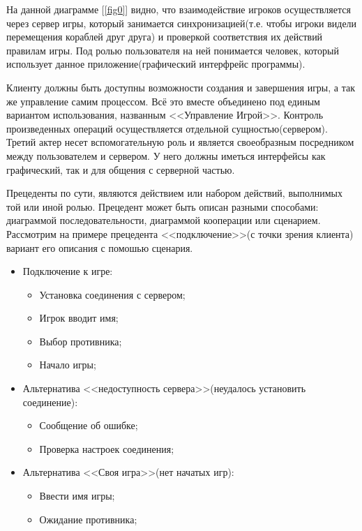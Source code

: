На данной диаграмме [\ref{fig0}] видно, что взаимодействие игроков осуществляется через сервер игры, который
занимается синхронизацией(т.е. чтобы игроки видели перемещения кораблей друг друга)
и проверкой соответствия их действий правилам игры. Под ролью пользователя на ней понимается 
человек, который использует данное приложение(графический интерфрейс программы).

Клиенту должны быть доступны возможности создания и завершения игры, а так же управление самим процессом. Всё это вместе объединено под единым вариантом использования, названным <<Управление Игрой>>. Контроль произведенных операций осуществляется отдельной сущностью(сервером). Третий актер несет вспомогательную роль и является своеобразным посредником между пользователем и сервером. У него должны иметься интерфейсы как графический, так и для общения с серверной частью. 

Прецеденты по сути, являются действием или набором действий, выполнимых той или иной ролью. Прецедент может быть описан разными способами: диаграммой последовательности, диаграммой кооперации или сценарием.
Рассмотрим на примере прецедента <<подключение>>(с точки зрения клиента) вариант его описания с помошью сценария.

\begin{itemize}
	\item Подключение к игре:
	\begin{itemize}
		\item Установка соединения с сервером;
		\item Игрок вводит имя;
		\item Выбор противника;
		\item Начало игры;
  	\end{itemize} 
	\item Альтернатива <<недоступность сервера>>(неудалось установить соединение): 
	\begin{itemize}
		\item Сообщение об ошибке;
		\item Проверка настроек соединения;
  	\end{itemize} 
	\item Альтернатива <<Своя игра>>(нет начатых игр):
	\begin{itemize}
		\item Ввести имя игры;
		\item Ожидание противника;
  	\end{itemize} 
\end{itemize} 

